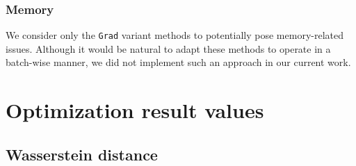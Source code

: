 \documentclass[runningheads, orivec]{llncs}
\begin{document}
\subsubsection{Memory} We consider only the \texttt{Grad} variant methods to potentially pose memory-related issues. Although it would be natural to adapt these methods to operate in a batch-wise manner, we did not implement such an approach in our current work.

\section{Optimization result values}  

\label{app:sec:result}
\subsection{Wasserstein distance}

\begin{table}[h!]
  \caption{Wasserstein distance manipulation cost of the fairwashing methods ($\text{DI}(Q_t) \geq 0.8$), cost calculated on the projected dataset : $W(Q_{n}, Q_{t})$ with the original dataset $Q_n$ and $Q_t = f(Q_n)$ with $f$ the fairwashing method}
  \label{app:fum_wass_result_A}
  \centering

\end{table}
\end{document}
